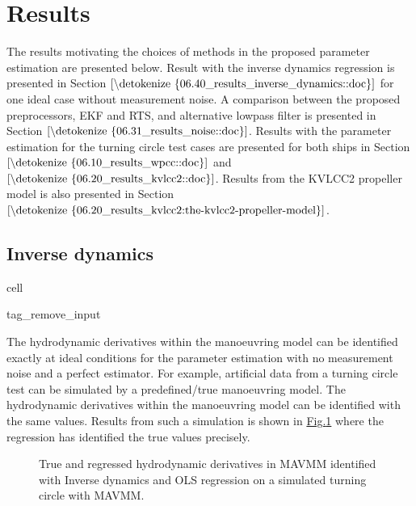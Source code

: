 \documentclass[review]{elsarticle}
\begin{document}
\section{Results}
\label{\detokenize{06.01_results:results}}\label{\detokenize{06.01_results:id1}}\label{\detokenize{06.01_results::doc}}
\sphinxAtStartPar
The results motivating the choices of methods in the proposed parameter estimation are presented below. Result with the inverse dynamics regression is presented in Section \(\ref{\detokenize{06.40_results_inverse_dynamics::doc}}\) for one ideal case without measurement noise. A comparison between the proposed preprocessors, EKF and RTS, and alternative low\sphinxhyphen{}pass filter is presented in Section \(\ref{\detokenize{06.31_results_noise::doc}}\). Results with the parameter estimation for the turning circle test cases are presented for both ships in Section \(\ref{\detokenize{06.10_results_wpcc::doc}}\) and \(\ref{\detokenize{06.20_results_kvlcc2::doc}}\). Results from the KVLCC2 propeller model is also presented in Section  \(\ref{\detokenize{06.20_results_kvlcc2:the-kvlcc2-propeller-model}}\).


\subsection{Inverse dynamics}
\label{\detokenize{06.40_results_inverse_dynamics:inverse-dynamics}}\label{\detokenize{06.40_results_inverse_dynamics::doc}}
\begin{sphinxuseclass}{cell}
\begin{sphinxuseclass}{tag_remove_input}
\end{sphinxuseclass}
\end{sphinxuseclass}
\sphinxAtStartPar
The hydrodynamic derivatives within the manoeuvring model can be identified exactly at ideal conditions for the parameter estimation with no measurement noise and a perfect estimator. For example, artificial data from a turning circle test can be simulated by a pre\sphinxhyphen{}defined/true manoeuvring model. The hydrodynamic derivatives within the manoeuvring model can be identified with the same values. Results from such a simulation is shown in \hyperref[\detokenize{06.40_results_inverse_dynamics:fig-bar-parameters}]{Fig.\@ \ref{\detokenize{06.40_results_inverse_dynamics:fig-bar-parameters}}} where the regression has identified the true values precisely.

\begin{figure}[H]
\centering
\capstart

\noindent{}
\caption{True and regressed hydrodynamic derivatives in MAVMM identified with Inverse dynamics and OLS regression on a simulated turning circle with MAVMM.}\label{\detokenize{06.40_results_inverse_dynamics:fig-bar-parameters}}\end{figure}
\end{document}
